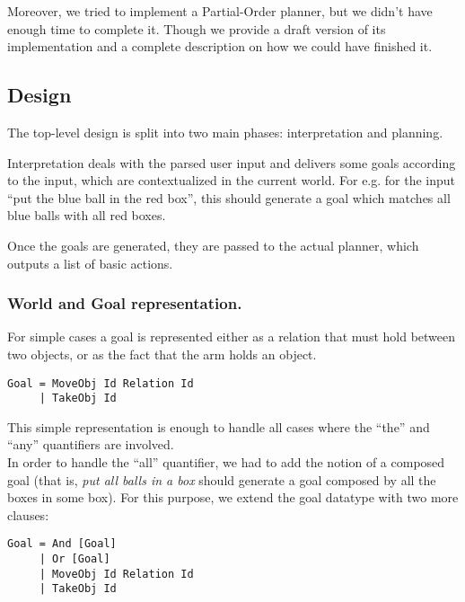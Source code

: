\documentclass[11pt]{article}
\begin{document}
        Moreover, we tried to implement a Partial-Order planner, but we didn't have 
        enough time to complete it. Though we provide a draft version of its
        implementation and a complete description on how we could have finished
        it.

	\subsection{Design}

	The top-level design is split into two main phases: interpretation and 
	planning.

	Interpretation deals with the parsed user input and delivers some goals 
        according to the input, which are contextualized in the current world.  
        For e.g. for the input ``put the blue ball in the red box'', this 
        should generate a goal which matches all blue balls with all red boxes.
	
	Once the goals are generated, they are passed to the actual planner, which 
	outputs a list of basic actions.

	\subsubsection{World and Goal representation.}
        
        For simple cases a goal is represented either as a relation that must 
        hold between two objects, or as the fact that the arm holds an object.  \\

\begin{lstlisting}
Goal = MoveObj Id Relation Id
     | TakeObj Id 
\end{lstlisting}

        This simple representation is enough to handle all cases where the ``the'' and
        ``any'' quantifiers are involved.  \\

        In order to handle the ``all'' quantifier, we had to add the notion of 
        a composed goal (that is, \textit{put all balls
        in a box} should generate a goal composed by all the boxes in some box). For 
        this purpose, we extend the goal datatype with two more clauses:  \\

\begin{lstlisting}
Goal = And [Goal]
     | Or [Goal]
     | MoveObj Id Relation Id
     | TakeObj Id 
\end{lstlisting}
\end{document}
